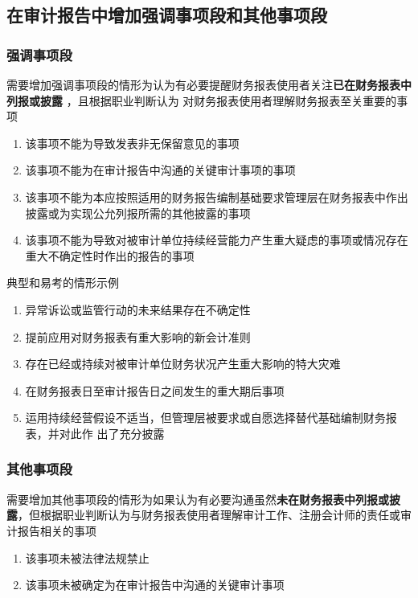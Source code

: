 \documentclass[UTF8,12pt]{ctexart}
\numberwithin{equation}{section} %
\numberwithin{figure}{section}
\numberwithin{table}{section}
\begin{document}
	
	\subsection{在审计报告中增加强调事项段和其他事项段}
	
	\subsubsection{强调事项段}
	需要增加强调事项段的情形为认为有必要提醒财务报表使用者关注\textbf{已在财务报表中列报或披露}  ，且根据职业判断认为 对财务报表使用者理解财务报表至关重要的事项
	\begin{enumerate}
		\item 该事项不能为导致发表非无保留意见的事项
		 
		\item 该事项不能为在审计报告中沟通的关键审计事项的事项
		
		\item 该事项不能为本应按照适用的财务报告编制基础要求管理层在财务报表中作出披露或为实现公允列报所需的其他披露的事项
		
		\item 该事项不能为导致对被审计单位持续经营能力产生重大疑虑的事项或情况存在重大不确定性时作出的报告的事项
	\end{enumerate}
	
	
	典型和易考的情形示例
	\begin{enumerate}
		\item 异常诉讼或监管行动的未来结果存在不确定性 
		
		\item 提前应用对财务报表有重大影响的新会计准则 
		
		\item 存在已经或持续对被审计单位财务状况产生重大影响的特大灾难 
		
		\item 在财务报表日至审计报告日之间发生的重大期后事项 
		
		\item 运用持续经营假设不适当，但管理层被要求或自愿选择替代基础编制财务报表，并对此作 出了充分披露
	\end{enumerate}
	
	
	\subsubsection{其他事项段}
	需要增加其他事项段的情形为如果认为有必要沟通虽然\textbf{未在财务报表中列报或披露}，但根据职业判断认为与财务报表使用者理解审计工作、注册会计师的责任或审计报告相关的事项
	\begin{enumerate}
		\item 该事项未被法律法规禁止
	
		\item 该事项未被确定为在审计报告中沟通的关键审计事项
	\end{enumerate}
	  
\end{document}
